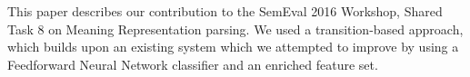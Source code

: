 This paper describes our contribution to the SemEval 2016 Workshop, Shared Task 8 on Meaning Representation parsing. We used a transition-based approach, which builds upon an existing system which we attempted to improve by using a Feedforward Neural Network classifier and an enriched feature set.
